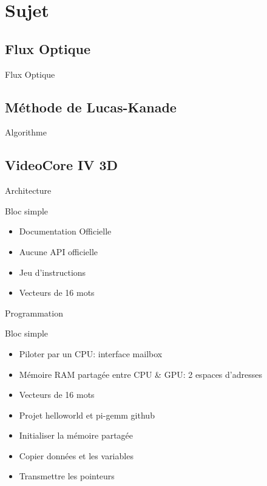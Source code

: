 \documentclass{bredelebeamer}
\begin{document}
\section{Sujet}
	\subsection{Flux Optique}

\begin{frame}{Flux Optique}
\end{frame}

	\subsection{Méthode de Lucas-Kanade}
\begin{frame}{Algorithme}
\end{frame}

	\subsection{VideoCore IV 3D}
\begin{frame}{Architecture}
\begin{block}{Bloc simple}
\begin{itemize}
\item Documentation Officielle
\item Aucune API officielle
\item Jeu d'instructions
\item Vecteurs de 16 mots
\end{itemize}
\end{block}

\end{frame}

\begin{frame}{Programmation}
\begin{block}{Bloc simple}
\begin{itemize}
\item Piloter par un CPU: interface mailbox
\item Mémoire RAM partagée entre CPU \& GPU: 2 espaces d'adresses
\item Vecteurs de 16 mots
\item Projet helloworld et pi-gemm github
\item Initialiser la mémoire partagée
\item Copier données et les variables
\item Transmettre les pointeurs
\end{itemize}
\end{block}
\end{frame}
\end{document}
